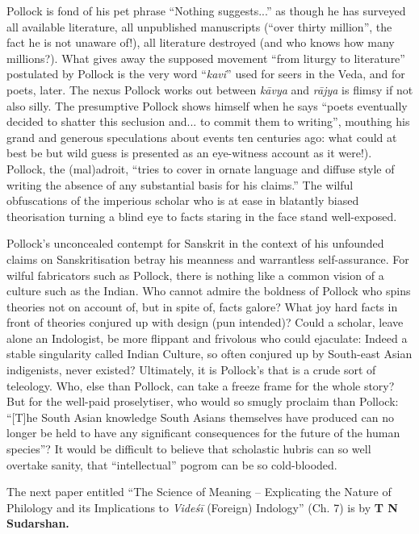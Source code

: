 Pollock is fond of his pet phrase “Nothing suggests...” as though he has surveyed all available literature, all unpublished manuscripts (“over thirty million”, the fact he is not unaware of!), all literature destroyed (and who knows how many millions?). What gives away the supposed movement “from liturgy to literature” postulated by Pollock is the very word “\textit{kavi}” used for seers in the Veda, and for poets, later. The nexus Pollock works out between \textit{kāvya} and \textit{rājya} is flimsy if not also silly. The presumptive Pollock shows himself when he says “poets eventually decided to shatter this seclusion and... to commit them to writing”, mouthing his grand and generous speculations about events ten centuries ago: what could at best be but wild guess is presented as an eye-witness account as it were!). Pollock, the (mal)adroit, “tries to cover in ornate language and diffuse style of writing the absence of any substantial basis for his claims.” The wilful obfuscations of the imperious scholar who is at ease in blatantly biased theorisation turning a blind eye to facts staring in the face stand well-exposed.

Pollock’s unconcealed contempt for Sanskrit in the context of his unfounded claims on Sanskritisation betray his meanness and warrantless self-assurance. For wilful fabricators such as Pollock, there is nothing like a common vision of a culture such as the Indian. Who cannot admire the boldness of Pollock who spins theories not on account of, but in spite of, facts galore? What joy hard facts in front of theories conjured up with design (pun intended)? Could a scholar, leave alone an Indologist, be more flippant and frivolous who could ejaculate: Indeed a stable singularity called Indian Culture, so often conjured up by South-east Asian indigenists, never existed? Ultimately, it is Pollock’s that is a crude sort of teleology. Who, else than Pollock, can take a freeze frame for the whole story? But for the well-paid proselytiser, who would so smugly proclaim than Pollock: “[T]he South Asian knowledge South Asians themselves have produced can no longer be held to have any significant consequences for the future of the human species”? It would be difficult to believe that scholastic hubris can so well overtake sanity, that “intellectual” pogrom can be so cold-blooded.

The next paper entitled “The Science of Meaning – Explicating the Nature of Philology and its Implications to \textit{Videśī} (Foreign) Indology” (Ch. 7) is by \textbf{T N Sudarshan.}

